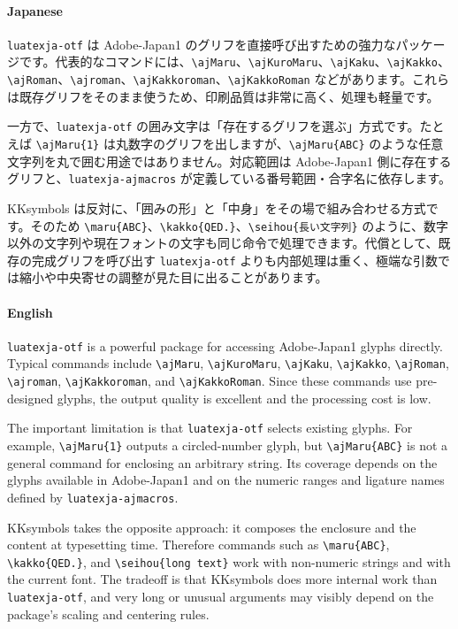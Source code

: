 \documentclass[luatex,fontsize=8pt,paper=b5,twoside]{jlreq}%
\begin{document}
\paragraph{Japanese}
\texttt{luatexja-otf} は Adobe-Japan1 のグリフを直接呼び出すための強力なパッケージです。代表的なコマンドには、\verb|\ajMaru|、\verb|\ajKuroMaru|、\verb|\ajKaku|、\verb|\ajKakko|、\verb|\ajRoman|、\verb|\ajroman|、\verb|\ajKakkoroman|、\verb|\ajKakkoRoman| などがあります。これらは既存グリフをそのまま使うため、印刷品質は非常に高く、処理も軽量です。

一方で、\texttt{luatexja-otf} の囲み文字は「存在するグリフを選ぶ」方式です。たとえば \verb|\ajMaru{1}| は丸数字のグリフを出しますが、\verb|\ajMaru{ABC}| のような任意文字列を丸で囲む用途ではありません。対応範囲は Adobe-Japan1 側に存在するグリフと、\texttt{luatexja-ajmacros} が定義している番号範囲・合字名に依存します。

KKsymbols は反対に、「囲みの形」と「中身」をその場で組み合わせる方式です。そのため \verb|\maru{ABC}|、\verb|\kakko{QED.}|、\verb|\seihou{長い文字列}| のように、数字以外の文字列や現在フォントの文字も同じ命令で処理できます。代償として、既存の完成グリフを呼び出す \texttt{luatexja-otf} よりも内部処理は重く、極端な引数では縮小や中央寄せの調整が見た目に出ることがあります。

\paragraph{English}
\texttt{luatexja-otf} is a powerful package for accessing Adobe-Japan1 glyphs directly. Typical commands include \verb|\ajMaru|, \verb|\ajKuroMaru|, \verb|\ajKaku|, \verb|\ajKakko|, \verb|\ajRoman|, \verb|\ajroman|, \verb|\ajKakkoroman|, and \verb|\ajKakkoRoman|. Since these commands use pre-designed glyphs, the output quality is excellent and the processing cost is low.

The important limitation is that \texttt{luatexja-otf} selects existing glyphs. For example, \verb|\ajMaru{1}| outputs a circled-number glyph, but \verb|\ajMaru{ABC}| is not a general command for enclosing an arbitrary string. Its coverage depends on the glyphs available in Adobe-Japan1 and on the numeric ranges and ligature names defined by \texttt{luatexja-ajmacros}.

KKsymbols takes the opposite approach: it composes the enclosure and the content at typesetting time. Therefore commands such as \verb|\maru{ABC}|, \verb|\kakko{QED.}|, and \verb|\seihou{long text}| work with non-numeric strings and with the current font. The tradeoff is that KKsymbols does more internal work than \texttt{luatexja-otf}, and very long or unusual arguments may visibly depend on the package's scaling and centering rules.
\end{document}
